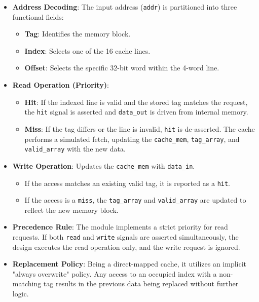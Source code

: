 \begin{itemize}

    \item \textbf{Address Decoding}: The input address (\texttt{addr}) is partitioned into three functional fields:
    \begin{itemize}
        \item \textbf{Tag}: Identifies the memory block.
        \item \textbf{Index}: Selects one of the 16 cache lines.
        \item \textbf{Offset}: Selects the specific 32-bit word within the 4-word line.
    \end{itemize}

    \item \textbf{Read Operation (Priority)}: 
    \begin{itemize}
        \item \textbf{Hit}: If the indexed line is valid and the stored tag matches the request, the \texttt{hit} signal is asserted and \texttt{data\_out} is driven from internal memory.
        \item \textbf{Miss}: If the tag differs or the line is invalid, \texttt{hit} is de-asserted. The cache performs a simulated fetch, updating the \texttt{cache\_mem}, \texttt{tag\_array}, and \texttt{valid\_array} with the new data.
    \end{itemize}
    
    \item \textbf{Write Operation}: Updates the \texttt{cache\_mem} with \texttt{data\_in}. 
    \begin{itemize}
        \item If the access matches an existing valid tag, it is reported as a \texttt{hit}.
        \item If the access is a \texttt{miss}, the \texttt{tag\_array} and \texttt{valid\_array} are updated to reflect the new memory block.
    \end{itemize}

    \item \textbf{Precedence Rule}: The module implements a strict priority for read requests. If both \texttt{read} and \texttt{write} signals are asserted simultaneously, the design executes the read operation only, and the write request is ignored.

    \item \textbf{Replacement Policy}: Being a direct-mapped cache, it utilizes an implicit "always overwrite" policy. Any access to an occupied index with a non-matching tag results in the previous data being replaced without further logic.

\end{itemize}